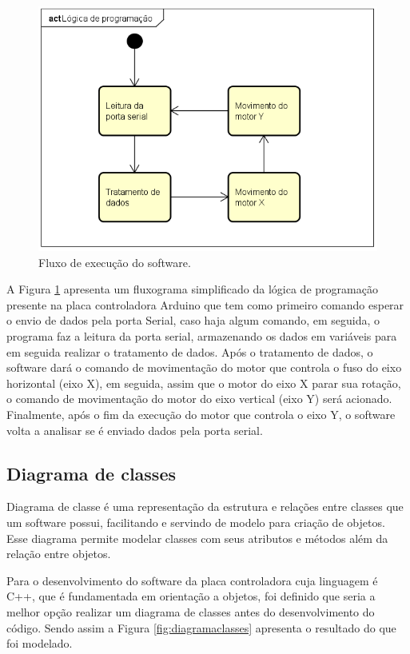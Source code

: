 \begin{figure}[H]
\centering
\caption{Fluxo de execução do software.}\label{fig:fluxoexecucao}
\includegraphics[width = 1\linewidth]{figuras/fluxoexecucao}
\end{figure}
    
A Figura \ref{fig:fluxoexecucao} apresenta um fluxograma simplificado da lógica de programação presente 
na placa controladora Arduino que tem como primeiro comando esperar o envio de dados pela porta Serial, 
caso haja algum comando, em seguida, o programa faz a leitura da porta serial, armazenando os dados 
em variáveis para em seguida realizar o tratamento de dados. Após o tratamento de dados, o software 
dará o comando de movimentação do motor que controla o fuso do eixo horizontal 
(eixo X), em seguida, assim que o motor do eixo X parar sua rotação, o comando de movimentação 
do motor do eixo vertical (eixo Y) será acionado. Finalmente, após o fim da execução do motor 
que controla o eixo Y, o software volta a analisar se é enviado dados pela porta serial.

\subsection{Diagrama de classes}\label{subsec:metdiagrama}

Diagrama de classe é uma representação da estrutura e relações entre classes que um software possui, 
facilitando e servindo de modelo para criação de objetos. Esse diagrama permite modelar classes com seus 
atributos e métodos além da relação entre objetos.

Para o desenvolvimento do software da placa controladora cuja linguagem é C++, que é fundamentada em 
orientação a objetos, foi definido que seria a melhor opção realizar um diagrama de classes antes do 
desenvolvimento do código. Sendo assim a Figura \ref{fig:diagramaclasses} apresenta o resultado do 
que foi modelado.

